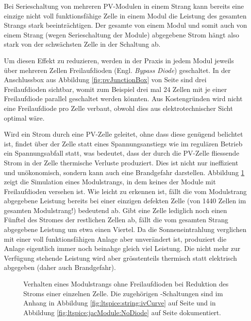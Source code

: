 Bei Serieschaltung von  mehreren PV-Modulen in einem Strang  kann bereits eine
einzige nicht  voll funktionsf\"ahige  Zelle in einem  Modul die  Leistung des
gesamten Strangs  stark beeintr\"achtigen.   Der gesamte  von einem  Modul und
somit auch von einem Strang (wegen Serieschaltung der Module) abgegebene Strom
h\"angt also stark von der schw\"achsten Zelle in der Schaltung ab.

Um  diesen  Effekt  zu  reduzieren,  werden  in  der  Praxis  in  jedem  Modul
jeweils  \"uber mehreren  Zellen  Freilaufdioden  (Engl. \emph{Bypass  Diode})
geschaltet. In  der  Anschlussbox  aus Abbildung  \ref{fig:pvJunctionBox}  von
Seite \pageref{fig:pvJunctionBox} sind drei Freilaufdioden sichtbar, womit zum
Beispiel drei  mal 24  Zellen mit je  einer Freilaufdiode  parallel geschaltet
werden k\"onnten. Aus Kostengr\"unden wird  nicht eine Freilaufdiode pro Zelle
verbaut, obwohl dies aus elektrotechnischer Sicht optimal w\"are.

\clearpage
Wird   ein   Strom   durch   eine   PV-Zelle   geleitet,   ohne   dass   diese
gen\"ugend   belichtet   ist,   findet    \"uber   der   Zelle   statt   eines
Spannungsanstiegs   wie    im   regul\"aren   Betrieb    ein   Spannungsabfall
statt,  was   bedeutet,  dass   der  durch   die  PV-Zelle   fliessende  Strom
in   der   Zelle   thermische   Verluste  produziert. Dies   ist   nicht   nur
ineffizient   und  un\"okonomisch,   sondern   kann   auch  eine   Brandgefahr
darstellen. Abbildung    \ref{fig:simu:iv-curves:array:generic}   zeigt    die
Simulation eines  Modulstrangs, in  dem keines  der Module  mit Freilaufdioden
versehen  ist. Wie  leicht  zu  erkennen  ist,  f\"allt  die  vom  Modulstrang
abgegebene Leistung bereits bei einer einzigen defekten Zelle (von 1440 Zellen
im gesamten Modulstrang!)  bedeutend ab. Gibt eine Zelle  lediglich noch einen
F\"unftel  des Stromes  der restlichen  Zellen  ab, f\"allt  die vom  gesamten
Strang  abgegebene Leistung  um etwa  einen Viertel. Da  die Sonneneintrahlung
verglichen mit  einer voll  funktionsf\"ahigen Anlage aber  unver\"andert ist,
produziert die Anlage eigentlich immer noch beinahge gleich viel Leistung. Die
nicht  mehr  zur  Verf\"ugung  stehende  Leistung  wird  aber  gr\"osstenteils
thermisch statt elektrisch abgegeben (daher auch Brandgefahr).


\begin{figure}[h!tb]
    \centering
    
    \caption[%
        IV- und PV-Kurven eines Modulsstrangs bei Leistungseinbruch,
        keine Freilaufdioden%
    ]
    {%
        Verhalten       eines      Modulstrangs       ohne      Freilaufdioden
        bei     Reduktion     des     Stroms    einer     einzelnen     Zelle.
        Die      zugeh\"origen     -Schaltungen      sind     im
        Anhang       in       Abbildung       \ref{fig:ltspice:string:ivCurve}
        auf     Seite      \pageref{fig:ltspice:string:ivCurve}     und     in
        Abbildung      \ref{fig:ltspice:jacModule:NoDiode}      auf      Seite
        \pageref{fig:ltspice:jacModule:NoDiode} dokumentiert.%
    }
    \label{fig:simu:iv-curves:array:generic}
\end{figure}

